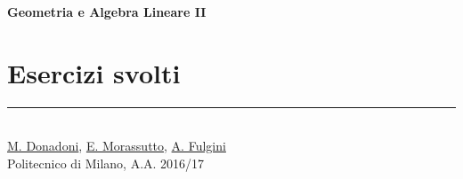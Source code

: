 




\raggedright
\footnotesize
\begin{multicols}{3}

\setlength{\premulticols}{1pt}
\setlength{\postmulticols}{1pt}
\setlength{\multicolsep}{1pt}
\setlength{\columnsep}{2pt}

{\Large{\textbf{Geometria e Algebra Lineare II}}}















\section{Esercizi svolti}
% 








\rule{0.3\linewidth}{0.25pt}
\scriptsize\\
\href{mailto:marco.donadoni@mail.polimi.it}{M. Donadoni}, \href{mailto:edoardo.morassutto@mail.polimi.it}{E. Morassutto},
\href{mailto:alessandro.fulgini@mail.polimi,it}{A. Fulgini} \\
Politecnico di Milano, A.A. 2016/17
\end{multicols}

